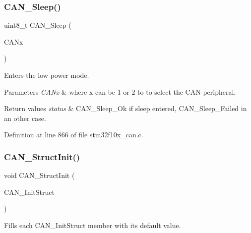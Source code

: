 \subsubsection{\texorpdfstring{C\+A\+N\+\_\+\+Sleep()}{CAN\_Sleep()}}
{\footnotesize\ttfamily uint8\+\_\+t C\+A\+N\+\_\+\+Sleep (\begin{DoxyParamCaption}\item[{\hyperlink{struct_c_a_n___type_def}{C\+A\+N\+\_\+\+Type\+Def} $\ast$}]{C\+A\+Nx }\end{DoxyParamCaption})}



Enters the low power mode. 


\begin{DoxyParams}{Parameters}
{\em C\+A\+Nx} & where x can be 1 or 2 to to select the C\+AN peripheral. \\
\hline
\end{DoxyParams}

\begin{DoxyRetVals}{Return values}
{\em status} & C\+A\+N\+\_\+\+Sleep\+\_\+\+Ok if sleep entered, C\+A\+N\+\_\+\+Sleep\+\_\+\+Failed in an other case. \\
\hline
\end{DoxyRetVals}


Definition at line 866 of file stm32f10x\+\_\+can.\+c.

\mbox{\label{group___c_a_n___private___functions_gad77ad810868ed111755fc9e8ae0c7646}} 
\subsubsection{\texorpdfstring{C\+A\+N\+\_\+\+Struct\+Init()}{CAN\_StructInit()}}
{\footnotesize\ttfamily void C\+A\+N\+\_\+\+Struct\+Init (\begin{DoxyParamCaption}\item[{\hyperlink{struct_c_a_n___init_type_def}{C\+A\+N\+\_\+\+Init\+Type\+Def} $\ast$}]{C\+A\+N\+\_\+\+Init\+Struct }\end{DoxyParamCaption})}



Fills each C\+A\+N\+\_\+\+Init\+Struct member with its default value. 


